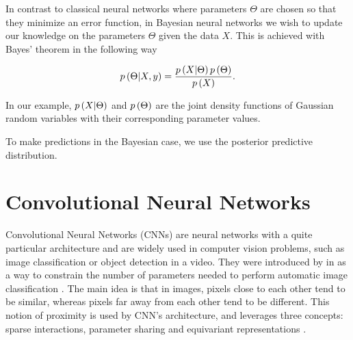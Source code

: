 In contrast to classical neural networks where parameters $\Theta$ are chosen so that they minimize an error function, in Bayesian neural networks we wish to update our knowledge on the parameters $\Theta$ given the data $X$. This is achieved with Bayes' theorem in the following way

$$
  p\left( \Theta | X, y \right) = \frac{p\left( X | \Theta \right) p\left( \Theta \right)}{p\left( X \right)}.
$$

In our example, $p\left( X | \Theta \right)$ and $p\left( \Theta \right)$ are the joint density functions of Gaussian random variables with their corresponding parameter values.

To make predictions in the Bayesian case, we use the posterior predictive distribution.



\section{Convolutional Neural Networks}

Convolutional Neural Networks (CNNs) are neural networks with a quite particular architecture and are widely used in computer vision problems, such as image classification or object detection in a video. They were introduced by \citeauthor{lecun1989generalization} in \citeyear{lecun1989generalization} as a way to constrain the number of parameters needed to perform automatic image classification \cite{lecun1989generalization}. The main idea is that in images, pixels close to each other tend to be similar, whereas pixels far away from each other tend to be different. This notion of proximity is used by CNN's architecture, and leverages three concepts: sparse interactions, parameter sharing and equivariant representations \cite[p.~335]{bengio2015deep}.

